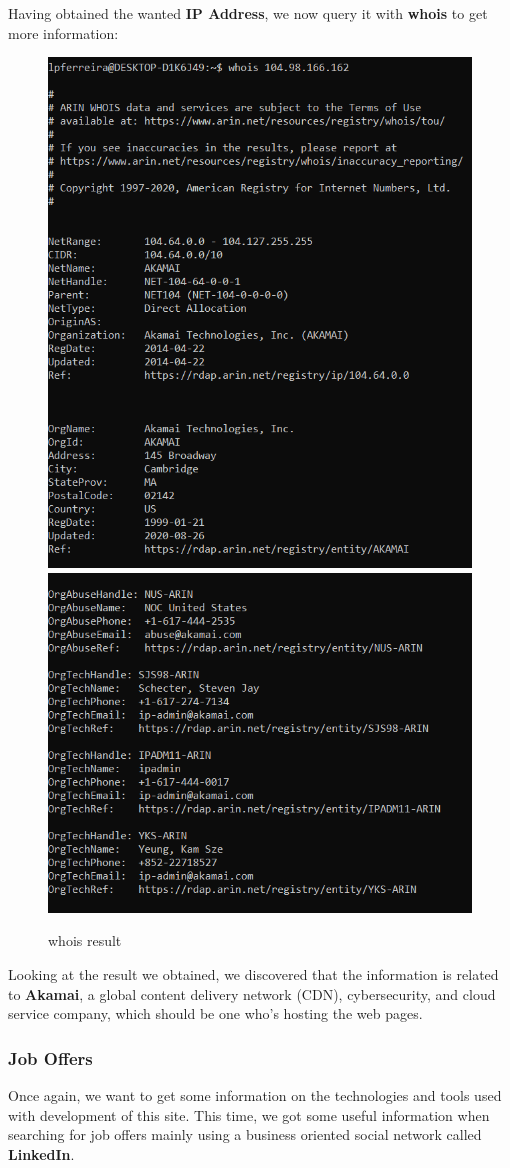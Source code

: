 Having obtained the wanted \textbf{IP Address}, we now query it with \textbf{whois} to get more information:

\begin{figure}[ht!]
 	\centering
 	\includegraphics[width=.61\linewidth]{img/whoisfarfetch1.PNG}
 	\includegraphics[width=.61\linewidth]{img/whoisfarfetch2.PNG}
 	\caption{whois result}
\end{figure}


Looking at the result we obtained, we discovered that the information is related to \textbf{Akamai}, a global content delivery network (CDN), cybersecurity, and cloud service company, which should be one who's hosting the web pages.

\subsubsection{Job Offers}
Once again, we want to get some information on the technologies and tools used with development of this site. This time, we got some useful information when searching for job offers mainly using a business oriented social network called \textbf{LinkedIn}\cite{linkedin1}.

